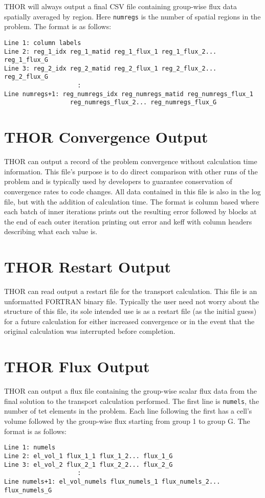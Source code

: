 \ac{THOR} will always output a final CSV file containing group-wise flux data spatially averaged by region.
Here \verb"numregs" is the number of spatial regions in the problem.
The format is as follows:
\begin{verbatim}
Line 1: column labels
Line 2: reg_1_idx reg_1_matid reg_1_flux_1 reg_1_flux_2... reg_1_flux_G
Line 3: reg_2_idx reg_2_matid reg_2_flux_1 reg_2_flux_2... reg_2_flux_G
                    :
Line numregs+1: reg_numregs_idx reg_numregs_matid reg_numregs_flux_1
                  reg_numregs_flux_2... reg_numregs_flux_G
\end{verbatim}

\section{THOR Convergence Output}\label{ch:out:sec:conv}

\ac{THOR} can output a record of the problem convergence without calculation time information.
This file's purpose is to do direct comparison with other runs of the problem and is typically used by developers to guarantee conservation of convergence rates to code changes.
All data contained in this file is also in the log file, but with the addition of calculation time.
The format is column based where each batch of inner iterations prints out the resulting error followed by blocks at the end of each outer iteration printing out error and keff with column headers describing what each value is.

\section{THOR Restart Output}\label{ch:out:sec:restart}

\ac{THOR} can read output a restart file for the transport calculation.
This file is an unformatted FORTRAN binary file.
Typically the user need not worry about the structure of this file, its sole intended use is as a restart file (as the initial guess) for a future calculation for either increased convergence or in the event that the original calculation was interrupted before completion.

\section{THOR Flux Output}\label{ch:out:sec:flux}

\ac{THOR} can output a flux file containing the group-wise scalar flux data from the final solution to the transport calculation performed.
The first line is \verb"numels", the number of tet elements in the problem.
Each line following the first has a cell's volume followed by the group-wise flux starting from group 1 to group G.
The format is as follows:
\begin{verbatim}
Line 1: numels
Line 2: el_vol_1 flux_1_1 flux_1_2... flux_1_G
Line 3: el_vol_2 flux_2_1 flux_2_2... flux_2_G
                    :
Line numels+1: el_vol_numels flux_numels_1 flux_numels_2... flux_numels_G
\end{verbatim}

